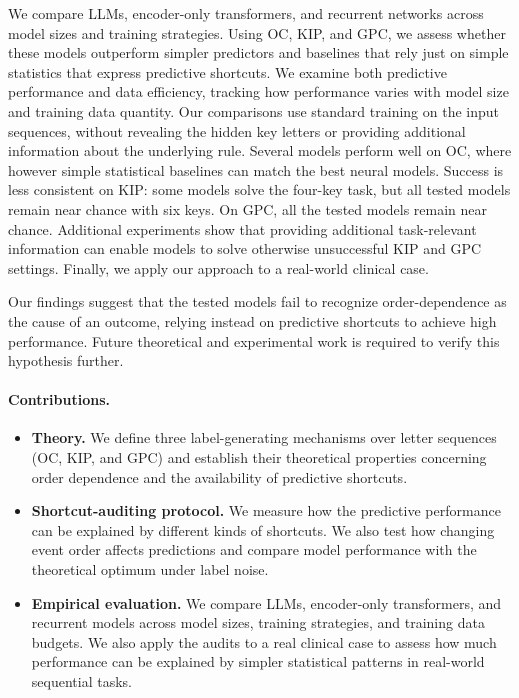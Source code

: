 \documentclass{article} %
\theoremstyle{plain}
\theoremstyle{definition}
\theoremstyle{remark}
\begin{document}
We compare LLMs, encoder-only transformers, and recurrent networks across model sizes and training strategies. Using OC, KIP, and GPC, we assess whether these models outperform simpler predictors and baselines that rely just on simple statistics that express predictive shortcuts. We examine both predictive performance and data efficiency, tracking how performance varies with model size and training data quantity. Our comparisons use standard training on the input sequences, without revealing the hidden key letters or providing additional information about the underlying rule. Several models perform well on OC, where however simple statistical baselines can match the best neural models. Success is less consistent on KIP: some models solve the four-key task, but all tested models remain near chance with six keys. On GPC, all the tested models remain near chance. Additional experiments show that providing additional task-relevant information can enable models to solve otherwise unsuccessful KIP and GPC settings. Finally, we apply our approach to a real-world clinical case.

Our findings suggest that the tested models fail to recognize order-dependence as the cause of an outcome, relying instead on predictive shortcuts to achieve high performance. Future theoretical and experimental work is required to verify this hypothesis further.

\paragraph{Contributions.}
\begin{itemize}[leftmargin=*,itemsep=1pt,topsep=2pt]
    \item \textbf{Theory.} We define three label-generating mechanisms over letter sequences (OC, KIP, and GPC) and establish their theoretical properties concerning order dependence and the availability of predictive shortcuts.
    \item \textbf{Shortcut-auditing protocol.} We measure how the predictive performance can be explained by different kinds of shortcuts. We also test how changing event order affects predictions and compare model performance with the theoretical optimum under label noise.
    \item \textbf{Empirical evaluation.} We compare LLMs, encoder-only transformers, and recurrent models across model sizes, training strategies, and training data budgets. We also apply the audits to a real clinical case to assess how much performance can be explained by simpler statistical patterns in real-world sequential tasks.
\end{itemize}
\end{document}
